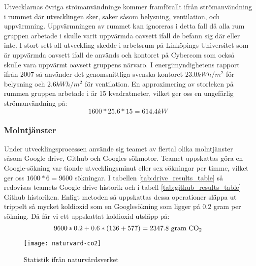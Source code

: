 Utvecklarnas övriga strömanvändninge kommer framförallt ifrån strömanvändning i rummet där utvecklingen sker, saker såsom belysning, ventilation, och uppvärmning. Uppvärmningen av rummet kan ignoreras i detta fall då alla rum gruppen arbetade i skulle varit uppvärmda oavsett ifall de befann sig där eller inte. I stort sett all utveckling skedde i arbetsrum på Linköpings Universitet som är uppvärmda oavsett ifall de används och kontoret på Cybercom som också skulle vara uppvärmt oavsett gruppens närvaro. I energimyndighetens rapport ifrån 2007\cite{emynd} så använder det genomsnittliga svenska kontoret $23.0kWh/m^2$ för belysning och $2.6kWh/m^2$ för ventilation. En approximering av storleken på rummen gruppen arbetade i är 15 kvadratmeter, vilket ger oss en ungefärlig strömanvändning på: $$1600 * 25.6 * 15 = 614.4kW$$

\subsubsection{Molntjänster}
Under utvecklingsprocessen använde sig teamet av flertal olika molntjänster såsom Google drive, Github och Googles sökmotor. Teamet uppskattas göra en Google-sökning var tionde utvecklingsminut eller sex sökningar per timme, vilket ger oss $1600 * 6 = 9600$ sökningar. I tabellen \ref{tab:drive_results_table} så redovisas teamets Google drive historik och i tabell \ref{tab:github_results_table} Github historiken. Enligt metoden så uppskattas dessa operationer släppa ut trippelt så mycket koldioxid som en Googlesökning som ligger på 0.2 gram per sökning\cite{google-blog}. Då får vi ett uppskattat koldioxid utsläpp på: $$9600 * 0.2 + 0.6 * (136 + 577) = 2347.8\text{ gram \ce{CO2}}$$





\begin{figure*}[h]
	\texttt{[image: naturvard-co2]}
	\caption{Statistik ifrån naturvårdsverket}
	\label{natuvard-co2}
\end{figure*}


